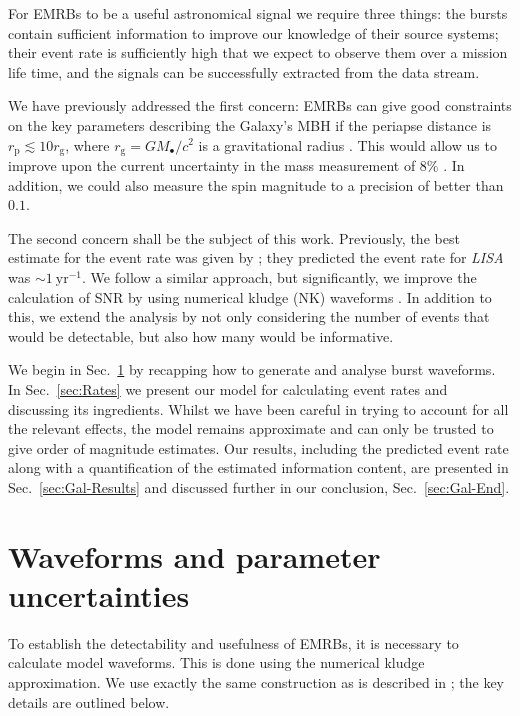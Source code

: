 \documentclass[useAMS,usedcolumn,usegraphicx,usenatbib]{mn2e}
\newcommand{\secref}[1]{Sec.~\ref{sec:#1}}
\newcommand{\units}[1]{\ensuremath{~\mathrm{#1}}}
\newcommand{\sub}[1]{\ensuremath{_\mathrm{#1}}}
\begin{document}
For EMRBs to be a useful astronomical signal we require three things: the bursts contain sufficient information to improve our knowledge of their source systems; their event rate is sufficiently high that we expect to observe them over a mission life time, and the signals can be successfully extracted from the data stream.

We have previously addressed the first concern: EMRBs can give good constraints on the key parameters describing the Galaxy's MBH if the periapse distance is $r\sub{p} \lesssim 10 r\sub{g}$, where $r\sub{g} = GM_\bullet/c^2$ is a gravitational radius \citep{Berry2013}. This would allow us to improve upon the current uncertainty in the mass measurement of $8\%$ \citep{Gillessen2009}. In addition, we could also measure the spin magnitude to a precision of better than $0.1$.

The second concern shall be the subject of this work. Previously, the best estimate for the event rate was given by \citet*{Hopman2007}; they predicted the event rate for \textit{LISA} was $\sim 1\units{yr^{-1}}$. We follow a similar approach, but significantly, we improve the calculation of SNR by using numerical kludge (NK) waveforms \citep{Babak2007}. In addition to this, we extend the analysis by not only considering the number of events that would be detectable, but also how many would be informative.

We begin in \secref{Waveforms} by recapping how to generate and analyse burst waveforms. In \secref{Rates} we present our model for calculating event rates and discussing its ingredients. Whilst we have been careful in trying to account for all the relevant effects, the model remains approximate and can only be trusted to give order of magnitude estimates. Our results, including the predicted event rate along with a quantification of the estimated information content, are presented in \secref{Gal-Results} and discussed further in our conclusion, \secref{Gal-End}.

\section{Waveforms and parameter uncertainties}\label{sec:Waveforms}

To establish the detectability and usefulness of EMRBs, it is necessary to calculate model waveforms. This is done using the numerical kludge approximation. We use exactly the same construction as is described in \citet{Berry2013}; the key details are outlined below.
\end{document}
